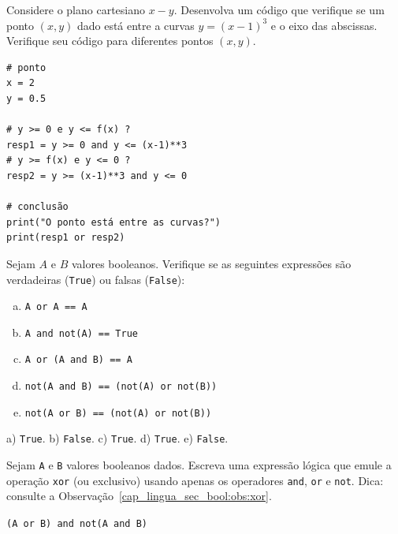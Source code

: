 \begin{exer}
  Considere o plano cartesiano $x-y$. Desenvolva um código que verifique se um ponto $(x, y)$ dado está entre a curvas $y = (x-1)^3$ e o eixo das abscissas. Verifique seu código para diferentes pontos $(x, y)$.
\end{exer}
\begin{resp}

\begin{lstlisting}
# ponto
x = 2
y = 0.5

# y >= 0 e y <= f(x) ?
resp1 = y >= 0 and y <= (x-1)**3
# y >= f(x) e y <= 0 ?
resp2 = y >= (x-1)**3 and y <= 0

# conclusão
print("O ponto está entre as curvas?")
print(resp1 or resp2)
\end{lstlisting}

\end{resp}

\begin{exer}
  Sejam $A$ e $B$ valores booleanos. Verifique se as seguintes expressões são verdadeiras (\texttt{True}) ou falsas (\texttt{False}):
  \begin{enumerate}[a)]
  \item \lstinline+A or A == A+
  \item \lstinline+A and not(A) == True+
  \item \lstinline+A or (A and B) == A+
  \item \lstinline+not(A and B) == (not(A) or not(B))+
  \item \lstinline+not(A or B) == (not(A) or not(B))+
  \end{enumerate}
\end{exer}
\begin{resp}
  a) \texttt{True}. b) \texttt{False}. c) \texttt{True}. d) \texttt{True}. e) \texttt{False}.
\end{resp}

\begin{exer}\label{cap_lingua_sec_bool:exer:xor}
  Sejam \texttt{A} e \texttt{B} valores booleanos dados. Escreva uma expressão lógica que emule a operação \lstinline+xor+ (ou exclusivo) usando apenas os operadores \lstinline+and+, \lstinline+or+ e \lstinline+not+. Dica: consulte a Observação~\ref{cap_lingua_sec_bool:obs:xor}.
\end{exer}
\begin{resp}
  \lstinline+(A or B) and not(A and B)+
\end{resp}

\ifisbook
